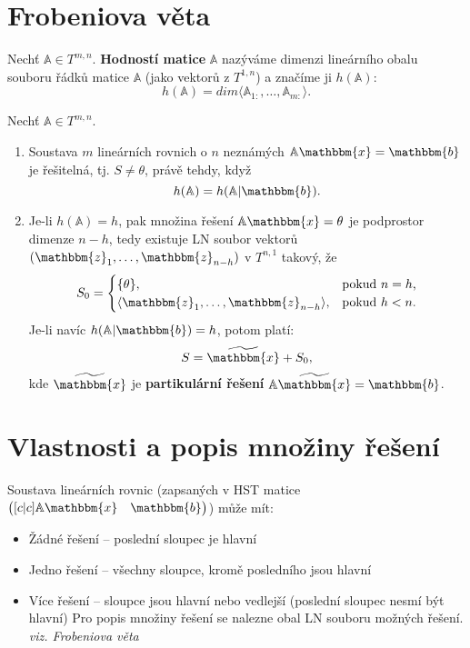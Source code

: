 \documentclass{szzclass}
\begin{document}
\section{Frobeniova věta}
\begin{definition}
Nechť $\mathbb{A}\in T^{m,n}$. \textbf{Hodností matice} $\mathbb{A}$ nazýváme dimenzi lineárního obalu souboru řádků matice $\mathbb{A}$ (jako vektorů z $T^{1,n}$) a značíme ji $h(\mathbb{A})$:
\begin{equation}
  h(\mathbb{A})=dim\langle \mathbb{A}_{1:},\dots,\mathbb{A}_{m:}\rangle.
\end{equation}
\end{definition}

\begin{theorem}
Nechť $\mathbb{A}\in T^{m,n}$.
\begin{enumerate}
\item Soustava $m$ lineárních rovnich o $n$ neznámých $\mathbb{A} \mathbbm{x}=\mathbbm{b}$ je řešitelná, tj. $S\neq\theta$, právě tehdy, když
$$
h(\mathbb{A})=h(\mathbb{A} | \mathbbm{b}).
$$
\item Je-li $h(\mathbb{A})=h$, pak množina řešení $\mathbb{A} \mathbbm{x}=\theta$ je podprostor dimenze $n-h$, tedy existuje LN soubor vektorů $(\mathbbm{z}_1,\dots,\mathbbm{z}_{n-h})$ v $T^{n,1}$ takový, že
$$ S_0=\begin{cases}
       \{\theta\}, & \text{pokud $n=h$,} \\
       \langle \mathbbm{z}_1,\dots,\mathbbm{z}_{n-h}\rangle, & \text{pokud $h<n$.}
       \end{cases}
$$
Je-li navíc $h(\mathbb{A}|\mathbbm{b})=h$, potom platí:
$$
S=\widetilde{\mathbbm{x}} + S_0,
$$ kde $\widetilde{\mathbbm{x}}$ je \textbf{partikulární řešení} $\mathbb{A} \widetilde{\mathbbm{x}}=\mathbbm{b}$.
\end{enumerate}
\end{theorem}

\section{Vlastnosti a popis množiny řešení}
Soustava lineárních rovnic (zapsaných v HST matice $\begin{pmatrix}[c|c]\mathbb{A}\mathbbm{x}&\mathbbm{b}\end{pmatrix}$) může mít:
\begin{itemize}
\item Žádné řešení -- poslední sloupec je hlavní
\item Jedno řešení -- všechny sloupce, kromě posledního jsou hlavní
\item Více řešení -- sloupce jsou hlavní nebo vedlejší (poslední sloupec nesmí být hlavní)
Pro popis množiny řešení se nalezne obal LN souboru možných řešení. \emph{viz. Frobeniova věta}
\end{itemize}
\end{document}
